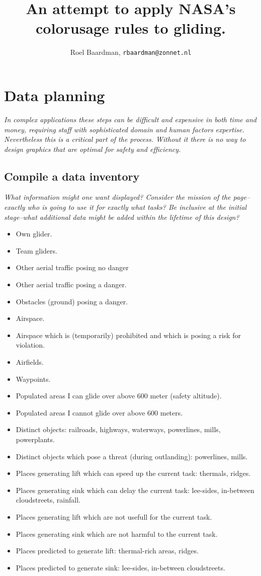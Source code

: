 \documentclass{article}
\newcommand{\myquote}[1]
{
	\textit{#1}
}
\begin{document}
\title{An attempt to apply NASA's colorusage rules to gliding.}
\author{Roel Baardman, \nolinkurl{rbaardman@zonnet.nl}}
\maketitle
\newpage
\tableofcontents
\newpage

\section{Data planning}
\myquote{In complex applications these steps can be difficult and expensive in both time and money, requiring staff with sophisticated domain and human factors expertise. Nevertheless this is a critical part of the process. Without it there is no way to design graphics that are optimal for safety and efficiency.}
\subsection{Compile a data inventory}
\myquote{What information might one want displayed? Consider the mission of the page--exactly who is going to use it for exactly what tasks? Be inclusive at the initial stage--what additional data might be added within the lifetime of this design?}
\begin{itemize}
\item Own glider.
\item Team gliders.
\item Other aerial traffic posing no danger
\item Other aerial traffic posing a danger.
\item Obstacles (ground) posing a danger.
\item Airspace.
\item Airspace which is (temporarily) prohibited and which is posing a risk for violation.
\item Airfields.
\item Waypoints.
\item Populated areas I can glide over above 600 meter (safety altitude).
\item Populated areas I cannot glide over above 600 meters.
\item Distinct objects: railroads, highways, waterways, powerlines, mills, powerplants.
\item Distinct objects which pose a threat (during outlanding): powerlines, mills.
\item Places generating lift which can speed up the current task: thermals, ridges.
\item Places generating sink which can delay the current task: lee-sides, in-between cloudstreets, rainfall.
\item Places generating lift which are not usefull for the current task.
\item Places generating sink which are not harmful to the current task.
\item Places predicted to generate lift: thermal-rich areas, ridges.
\item Places predicted to generate sink: lee-sides, in-between cloudstreets.
\end{itemize}
\end{document}
